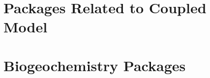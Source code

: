 \newpage


\newpage


\section{Packages Related to Coupled Model}
\newpage


\newpage


\newpage


\section{Biogeochemistry Packages}
\newpage


\newpage

